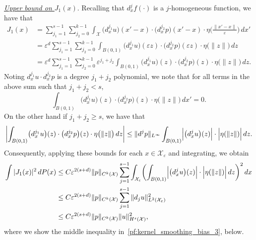 \documentclass{article}
\newcommand{\1}{\mathbf{1}}
\newcommand{\mc}[1]{\mathcal{#1}}
\theoremstyle{definition}
\theoremstyle{remark}
\begin{document}
\underline{\textit{Upper bound on $J_1(x)$}}.
Recalling that $d_x^jf(\cdot)$ is a $j$-homogeneous function, we have that
\begin{align*}
J_1(x) & = \sum_{j_1 = 1}^{s - 1} \sum_{j_2 = 0}^{k - 1} \int_{\mc{X}} \bigl(d_x^{j_1}u\bigr)(x' - x) \cdot \bigl(d_x^{j_2}p\bigr)(x' - x) \cdot \eta\biggl(\frac{\|x' - x\|}{\varepsilon}\biggr) \,dx' \\
& = \varepsilon^d \sum_{j_1 = 1}^{s - 1} \sum_{j_2 = 0}^{k - 1} \int_{B(0,1)} \bigl(d_{x }^{j_1}u\bigr)(\varepsilon z) \cdot \bigl(d_{x}^{j_2}p\bigr)(\varepsilon z) \cdot \eta\bigl(\|z\|\bigr) \,dz \\
& = \varepsilon^d \sum_{j_1 = 1}^{s - 1} \sum_{j_2 = 0}^{k - 1} \varepsilon^{j_1 + j_2} \int_{B(0,1)} \bigl(d_{x}^{j_1}u\bigr)(z) \cdot \bigl(d_{x}^{j_2}p\bigr)(z) \cdot \eta\bigl(\|z\|\bigr) \,dz.
\end{align*}
Noting $d_{x}^{j_1}u \cdot d_x^{j_2}p$ is a degree $j_1 + j_2$ polynomial, we note that for all terms in the above sum such that $j_1 + j_2 < s$,
\begin{equation*}
\int_{B(0,1)} \bigl(d_{x}^{j_1}u\bigr)(z) \cdot \bigl(d_{x}^{j_2}p\bigr)(z) \cdot \eta\bigl(\|z\|\bigr) \,dx' = 0.
\end{equation*}
On the other hand if $j_1 + j_2 \geq s$, we have that
\begin{align*}
\biggl|\int_{B(0,1)} \bigl(d_{x}^{j_1}u\bigr)(z) \cdot \bigl(d_{x}^{j_2}p\bigr)(z) \cdot \eta\bigl(\|z\|\bigr) \,dz\biggr| \leq \|d^jp\|_{L^{\infty}} \int_{B(0,1)} \Bigl|\bigl(d_x^{j}u\bigr)(z)\Bigr| \cdot \Bigl|\eta(\|z\|)\Bigr| \,dz.  
\end{align*}
Consequently, applying these bounds for each $x \in \mc{X}_{\varepsilon}$ and integrating, we obtain
\begin{align*}
\int |J_1(x)|^2 \,dP(x) & \leq C \varepsilon^{2(s + d)} \|p\|_{C^k(\mc{X})} \sum_{j = 1}^{s - 1}  \int_{\mc{X}_{\varepsilon}} \biggl(\int_{B(0,1)} \Bigl|\bigl(d_x^{j}u\bigr)(z)\Bigr| \cdot \Bigl|\eta(\|z\|)\Bigr| \,dz\biggr)^2 \,dx \\
& \leq C \varepsilon^{2(s + d)} \|p\|_{C^k(\mc{X})} \sum_{j = 1}^{s - 1} \|d_ju\|_{L^2(\mc{X}_{\varepsilon})}^2 \\
& \leq  C \varepsilon^{2(s + d)} \|p\|_{C^k(\mc{X})} \|u\|_{H^s(\mc{X})}^2,
\end{align*}
where we show the middle inequality in~\eqref{pf:kernel_smoothing_bias_3}, below.
\end{document}
